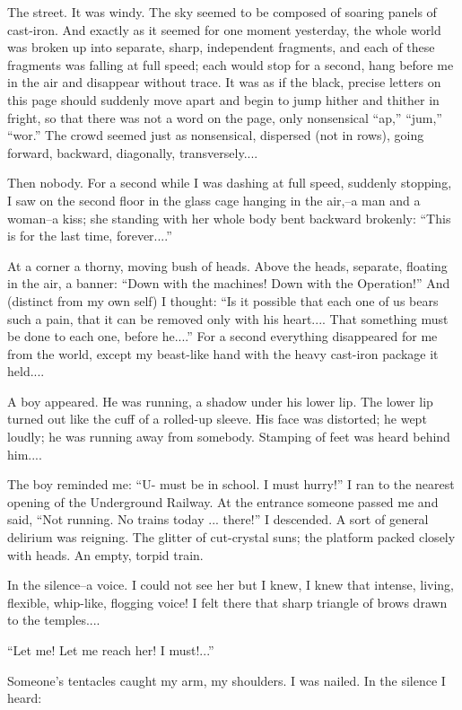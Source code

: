 \documentclass[11pt,openany]{book}
\begin{document}
The street. It was windy. The sky seemed to be composed of soaring panels of cast-iron. And exactly as it seemed for one moment yesterday, the whole world was broken up into separate, sharp, independent fragments, and each of these fragments was falling at full speed; each would stop for a second, hang before me in the air and disappear without trace. It was as if the black, precise letters on this page should suddenly move apart and begin to jump hither and thither in fright, so that there was not a word on the page, only nonsensical ``ap,'' ``jum,'' ``wor.'' The crowd seemed just as nonsensical, dispersed (not in rows), going forward, backward, diagonally, transversely....

Then nobody. For a second while I was dashing at full speed, suddenly stopping, I saw on the second floor in the glass cage hanging in the air,--a man and a woman--a kiss; she standing with her whole body bent backward brokenly: ``This is for the last time, forever....''

At a corner a thorny, moving bush of heads. Above the heads, separate, floating in the air, a banner: ``Down with the machines! Down with the Operation!'' And (distinct from my own self) I thought: ``Is it possible that each one of us bears such a pain, that it can be removed only with his heart.... That something must be done to each one, before he....'' For a second everything disappeared for me from the world, except my beast-like hand with the heavy cast-iron package it held....

A boy appeared. He was running, a shadow under his lower lip. The lower lip turned out like the cuff of a rolled-up sleeve. His face was distorted; he wept loudly; he was running away from somebody. Stamping of feet was heard behind him....

The boy reminded me: ``U- must be in school. I must hurry!'' I ran to the nearest opening of the Underground Railway. At the entrance someone passed me and said, ``Not running. No trains today ... there!'' I descended. A sort of general delirium was reigning. The glitter of cut-crystal suns; the platform packed closely with heads. An empty, torpid train.

In the silence--a voice. I could not see her but I knew, I knew that intense, living, flexible, whip-like, flogging voice! I felt there that sharp triangle of brows drawn to the temples....

``Let me! Let me reach her! I must!...''

Someone's tentacles caught my arm, my shoulders. I was nailed. In the silence I heard:
\end{document}
